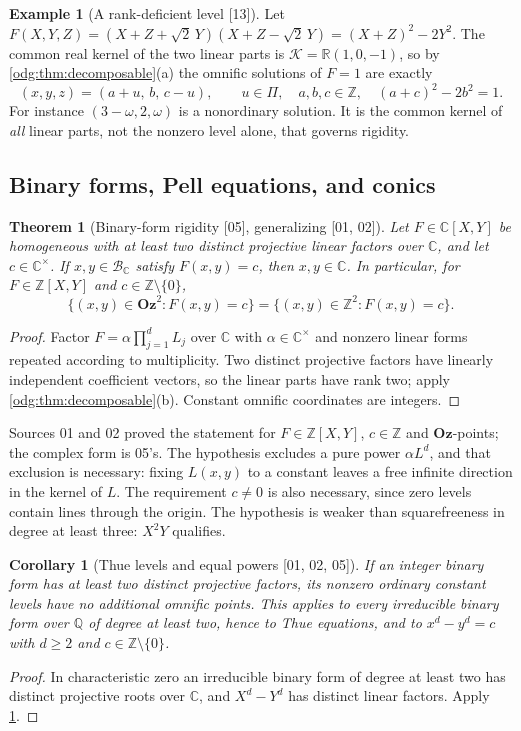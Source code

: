\documentclass[11pt,oneside]{article}
\numberwithin{equation}{section}
\newtheorem{theorem}{Theorem}[section]
\newtheorem{corollary}[corollary]{Corollary}
\theoremstyle{definition}
\newtheorem{example}[example]{Example}
\theoremstyle{remark}
\newcommand{\Oz}{\mathbf{Oz}}
\newcommand{\Z}{\mathbb Z}
\newcommand{\Q}{\mathbb Q}
\newcommand{\R}{\mathbb R}
\newcommand{\C}{\mathbb C}
\newcommand{\BC}{\mathcal B_{\C}}
\newcommand{\src}[1]{\textup{\textsf{\small[#1]}}}
\begin{document}
\begin{example}[A rank-deficient level \src{13}]\label{odg:dec:ex:rankdeficient}
Let $F(X,Y,Z)=(X+Z+\sqrt2\,Y)(X+Z-\sqrt2\,Y)=(X+Z)^2-2Y^2$. The common real
kernel of the two linear parts is $\mathcal K=\R(1,0,-1)$, so by
\cref{odg:thm:decomposable}(a) the omnific solutions of $F=1$ are exactly
\[
 (x,y,z)=(a+u,\,b,\,c-u),\qquad u\in\Pi,\quad a,b,c\in\Z,
 \quad (a+c)^2-2b^2=1 .
\]
For instance $(3-\omega,2,\omega)$ is a nonordinary solution. It is the
common kernel of \emph{all} linear parts, not the nonzero level alone, that
governs rigidity.
\end{example}

\subsection{Binary forms, Pell equations, and conics}

\begin{theorem}[Binary-form rigidity \src{05}, generalizing \src{01, 02}]\label{odg:thm:binary}
Let $F\in\C[X,Y]$ be homogeneous with at least two distinct projective
linear factors over $\C$, and let $c\in\C^\times$. If $x,y\in\BC$ satisfy
$F(x,y)=c$, then $x,y\in\C$. In particular, for $F\in\Z[X,Y]$ and
$c\in\Z\setminus\{0\}$,
\[
 \{(x,y)\in\Oz^2:F(x,y)=c\}
 =\{(x,y)\in\Z^2:F(x,y)=c\}.
\]
\end{theorem}
\begin{proof}
Factor $F=\alpha\prod_{j=1}^dL_j$ over $\C$ with $\alpha\in\C^\times$ and
nonzero linear forms repeated according to multiplicity. Two distinct
projective factors have linearly independent coefficient vectors, so the
linear parts have rank two; apply \cref{odg:thm:decomposable}(b). Constant
omnific coordinates are integers.
\end{proof}

Sources 01 and 02 proved the statement for $F\in\Z[X,Y]$, $c\in\Z$ and
$\Oz$-points; the complex form is 05's. The hypothesis excludes a pure power
$\alpha L^d$, and that exclusion is necessary: fixing $L(x,y)$ to a constant
leaves a free infinite direction in the kernel of $L$. The requirement
$c\ne0$ is also necessary, since zero levels contain lines through the
origin. The hypothesis is weaker than squarefreeness in degree at least
three: $X^2Y$ qualifies.

\begin{corollary}[Thue levels and equal powers \src{01, 02, 05}]\label{odg:cor:thue}
If an integer binary form has at least two distinct projective factors,
its nonzero ordinary constant levels have no additional omnific points.
This applies to every irreducible binary form over $\Q$ of degree at least
two, hence to Thue equations, and to $x^d-y^d=c$ with $d\ge2$ and
$c\in\Z\setminus\{0\}$.
\end{corollary}
\begin{proof}
In characteristic zero an irreducible binary form of degree at least two has
distinct projective roots over $\C$, and $X^d-Y^d$ has distinct linear
factors. Apply \cref{odg:thm:binary}.
\end{proof}
\end{document}
